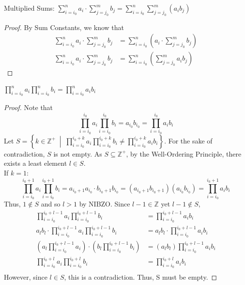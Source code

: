 \begin{lemma} Multiplied Sums: $\sum\limits _{i=i_0}^{n}  a_i \cdot \sum\limits _{j=j_0}^{m}  b_j = \sum\limits _{i=i_0}^{n} \sum\limits _{j=j_0}^{m} (a_ib_j)$ \end{lemma}
\begin{proof} By Sum Constants, we know that 
\begin{align*} \sum\limits _{i=i_0}^{n}  a_i \cdot \sum\limits _{j=j_0}^{m}  b_j &= \sum\limits _{i=i_0}^{n} (a_i \cdot \sum\limits _{j=j_0}^{m}  b_j) \\
 \sum\limits _{i=i_0}^{n}  a_i \cdot \sum\limits _{j=j_0}^{m}  b_j &= \sum\limits _{i=i_0}^{n} (\sum\limits _{j=j_0}^{m}  a_i b_j) 
\end{align*} \end{proof}


\begin{lemma} $\prod\limits _{i=i_0}^{n}  a_i  \prod\limits _{i=i_0}^{n}  b_i = \prod\limits _{i=i_0}^{n} a_ib_i$\end{lemma}
\begin{proof}
 \normalfont Note that \[\prod_{i=i_0}^{i_0}  a_i \prod_{i=i_0}^{i_0}  b_i = a_{i_0}b_{i_0}=\prod_{i=i_0}^{i_0}  a_ib_i\]
Let $S=\left \{k \in \mathbb{Z}^+  \; \middle |  \;\prod\limits_{i=i_0}^{i_0+k}  a_i   \prod\limits_{i=i_0}^{i_0+k}  b_i \neq  \prod\limits_{i=i_0}^{i_0+k}  a_i b_i\right \}$. For the sake of contradiction, $S$ is not empty. As $S \subseteq \mathbb{Z}^+$, by the Well-Ordering Principle, there exists a least element $l \in S$. \\
If $k=1$: \[
 \prod_{i=i_0}^{i_0+1}  a_i \prod_{i=i_0}^{i_0+1}  b_i = a_{i_0+1} a_{i_0}\cdot b_{i_0+1}b_{i_0}= (a_{i_0+1}b_{i_0+1})(a_{i_0}b_{i_0}) =\prod_{i=i_0}^{i_0+1}  a_ib_i
\]
Thus, $1 \notin S$ and so $l>1$ by NIBZO. Since $l-1 \in \mathbb{Z}$ yet $l-1 \notin S$, 
\begin{align*} \prod\limits _{i=i_0}^{i_0+l-1}  a_i  \prod\limits _{i=i_0}^{i_0+l-1}  b_i &= \prod\limits _{i=i_0}^{i_0+l-1} a_ib_i \\
a_l  b_l \cdot \prod\limits _{i=i_0}^{i_0+l-1}  a_i  \prod\limits _{i=i_0}^{i_0+l-1}  b_i &= a_l  b_l \cdot\prod\limits _{i=i_0}^{i_0+l-1} a_ib_i\\
(a_l  \prod\limits _{i=i_0}^{i_0+l-1}  a_i) \cdot (b_l \prod\limits _{i=i_0}^{i_0+l-1}  b_i) &= (a_l  b_l)\prod\limits _{i=i_0}^{i_0+l-1} a_ib_i\\
\prod\limits _{i=i_0}^{i_0+l}  a_i  \prod\limits _{i=i_0}^{i_0+l}  b_i &= \prod\limits _{i=i_0}^{i_0+l} a_ib_i\\
\end{align*}
However, since $l \in S$, this is a contradiction. Thus, S must be empty. \end{proof}

